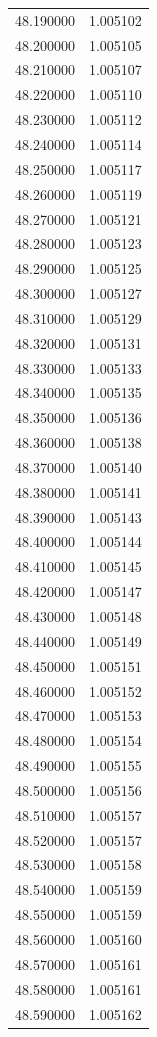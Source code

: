 \begin{tabular}{rr}
48.190000 & 1.005102 \\
48.200000 & 1.005105 \\
48.210000 & 1.005107 \\
48.220000 & 1.005110 \\
48.230000 & 1.005112 \\
48.240000 & 1.005114 \\
48.250000 & 1.005117 \\
48.260000 & 1.005119 \\
48.270000 & 1.005121 \\
48.280000 & 1.005123 \\
48.290000 & 1.005125 \\
48.300000 & 1.005127 \\
48.310000 & 1.005129 \\
48.320000 & 1.005131 \\
48.330000 & 1.005133 \\
48.340000 & 1.005135 \\
48.350000 & 1.005136 \\
48.360000 & 1.005138 \\
48.370000 & 1.005140 \\
48.380000 & 1.005141 \\
48.390000 & 1.005143 \\
48.400000 & 1.005144 \\
48.410000 & 1.005145 \\
48.420000 & 1.005147 \\
48.430000 & 1.005148 \\
48.440000 & 1.005149 \\
48.450000 & 1.005151 \\
48.460000 & 1.005152 \\
48.470000 & 1.005153 \\
48.480000 & 1.005154 \\
48.490000 & 1.005155 \\
48.500000 & 1.005156 \\
48.510000 & 1.005157 \\
48.520000 & 1.005157 \\
48.530000 & 1.005158 \\
48.540000 & 1.005159 \\
48.550000 & 1.005159 \\
48.560000 & 1.005160 \\
48.570000 & 1.005161 \\
48.580000 & 1.005161 \\
48.590000 & 1.005162 \\

\end{tabular}
